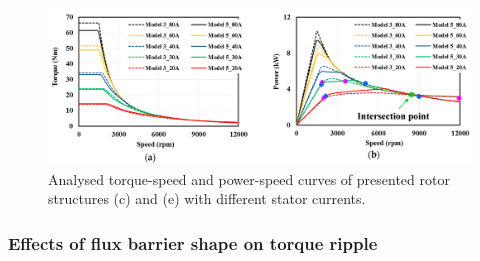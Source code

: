 \documentclass[a4paper, twoside, 11pt]{article}
\begin{document}
    \begin{figure}[htbp!]
            \centering
            \includegraphics[width=1\textwidth]{src/png/pm-positioning-torque-speed-curves-2.png}
            \caption{Analysed torque-speed and power-speed curves of presented rotor structures (c) and (e) with different stator currents. \cite{ngo-performance-analysis-of-synchronous-reluctance-motor-with-limited-amount-of-permanent-magnet}}
            \label{fig:pm-positioning-torque-speed-curves-2}
    \end{figure}

\subsubsection{Effects of flux barrier shape on torque ripple}
\end{document}
